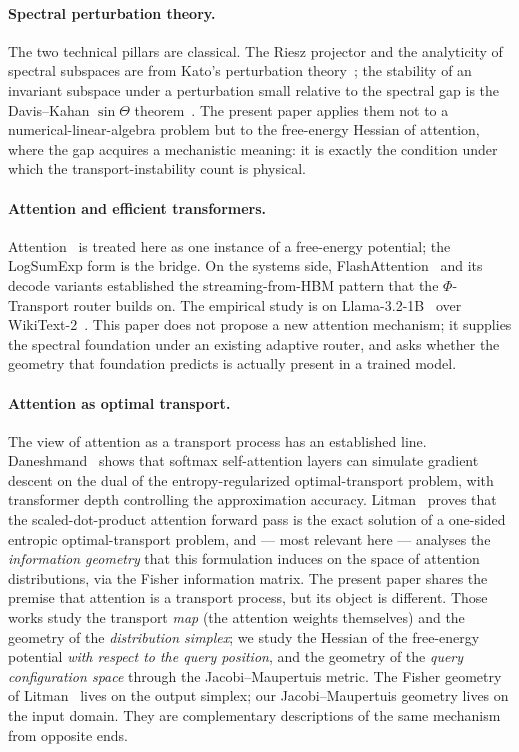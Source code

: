\documentclass[11pt]{article}
\theoremstyle{plain}
\theoremstyle{definition}
\begin{document}
\paragraph{Spectral perturbation theory.}
The two technical pillars are classical. The Riesz projector and the
analyticity of spectral subspaces are from Kato's perturbation
theory~\cite{kato1995perturbation}; the stability of an invariant
subspace under a perturbation small relative to the spectral gap is the
Davis--Kahan $\sin\Theta$ theorem~\cite{davis1970rotation}. The present
paper applies them not to a numerical-linear-algebra problem but to the
free-energy Hessian of attention, where the gap acquires a mechanistic
meaning: it is exactly the condition under which the transport-instability
count is physical.

\paragraph{Attention and efficient transformers.}
Attention~\cite{vaswani2017attention} is treated here as one instance of a
free-energy potential; the LogSumExp form is the bridge. On the systems
side, FlashAttention~\cite{dao2022flashattention} and its decode variants
established the streaming-from-HBM pattern that the $\Phi$-Transport
router builds on. The empirical study is on
Llama-3.2-1B~\cite{grattafiori2024llama} over
WikiText-2~\cite{merity2017pointer}. This paper does not propose a new
attention mechanism; it supplies the spectral foundation under an existing
adaptive router, and asks whether the geometry that foundation predicts is
actually present in a trained model.

\paragraph{Attention as optimal transport.}
The view of attention as a transport process has an established line.
Daneshmand~\cite{daneshmand2024provable} shows that softmax self-attention
layers can simulate gradient descent on the dual of the
entropy-regularized optimal-transport problem, with transformer depth
controlling the approximation accuracy. Litman~\cite{litman2025sdpa}
proves that the scaled-dot-product attention forward pass is the exact
solution of a one-sided entropic optimal-transport problem, and --- most
relevant here --- analyses the \emph{information geometry} that this
formulation induces on the space of attention distributions, via the
Fisher information matrix. The present paper shares the premise that
attention is a transport process, but its object is different. Those works
study the transport \emph{map} (the attention weights themselves) and the
geometry of the \emph{distribution simplex}; we study the Hessian of the
free-energy potential \emph{with respect to the query position}, and the
geometry of the \emph{query configuration space} through the
Jacobi--Maupertuis metric. The Fisher geometry of
Litman~\cite{litman2025sdpa} lives on the output simplex; our
Jacobi--Maupertuis geometry lives on the input domain. They are
complementary descriptions of the same mechanism from opposite ends.
\end{document}
